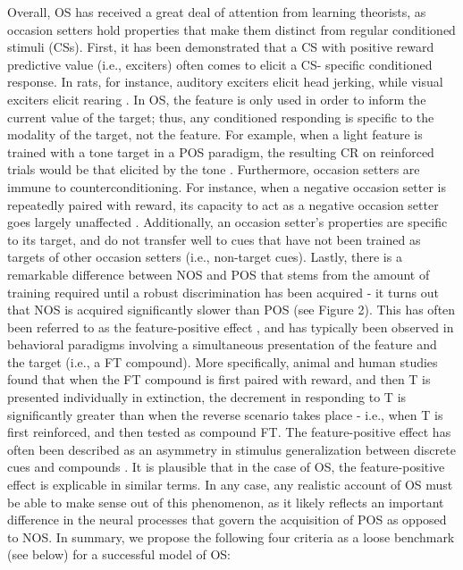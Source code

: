 \documentclass[11pt]{article}
\let\cite=\citep
\begin{document}
Overall, OS has received a great deal of attention from learning theorists, as 
occasion setters hold properties that make them distinct from regular 
conditioned stimuli (CSs). First, it has been demonstrated that a CS with 
positive reward predictive value (i.e., exciters) often comes to elicit a CS-
specific conditioned response. In rats, for instance, auditory exciters elicit 
head jerking, while visual exciters elicit rearing \cite{Holland1984}. In OS, 
the feature is only used in order to inform the current value of the target; 
thus, any conditioned responding is specific to the modality of the target, not 
the feature. For example, when a light feature is trained with a tone target in 
a POS paradigm, the resulting CR on reinforced trials would be that elicited by 
the tone \cite{Ross1981}. Furthermore, occasion setters are immune to 
counterconditioning. For instance, when a negative occasion setter is 
repeatedly paired with reward, its capacity to act as a negative occasion 
setter goes largely unaffected \cite{Holland1991, Holland1992}. Additionally, 
an occasion setter's properties are specific to its target, and do not transfer 
well to cues that have not been trained as targets of other occasion setters 
(i.e., non-target cues). Lastly, there is a remarkable difference between NOS 
and POS that stems from the amount of training required until a robust 
discrimination has been acquired - it turns out that NOS is acquired 
significantly slower than POS (see Figure 2). This has often been referred to 
as the feature-positive effect \cite{Jenkins1970}, and has typically been 
observed in behavioral paradigms involving a simultaneous presentation of the 
feature and the target (i.e., a FT compound). More specifically, animal 
\cite{Gonzalez2003} and human \cite{Wheeler2006} studies found that when the FT 
compound is first paired with reward, and then T is presented individually in 
extinction, the decrement in responding to T is significantly greater than when 
the reverse scenario takes place - i.e., when T is first reinforced, and then 
tested as compound FT. The feature-positive effect has often been described as 
an asymmetry in stimulus generalization between discrete cues and compounds 
\cite{Bouton2012}. It is plausible that in the case of OS, the feature-positive 
effect is explicable in similar terms. In any case, any realistic account of OS 
must be able to make sense out of this phenomenon, as it likely reflects an 
important difference in the neural processes that govern the acquisition of POS 
as opposed to NOS. In summary, we propose the following four criteria as a 
loose benchmark (see below) for a successful model of OS:
\end{document}
